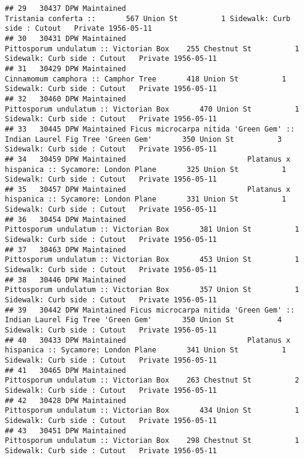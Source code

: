 \documentclass[
]{article}
\begin{document}
\begin{verbatim}
## 29   30437 DPW Maintained                                                     Tristania conferta ::       567 Union St          1 Sidewalk: Curb side : Cutout   Private 1956-05-11
## 30   30431 DPW Maintained                                    Pittosporum undulatum :: Victorian Box    255 Chestnut St          1 Sidewalk: Curb side : Cutout   Private 1956-05-11
## 31   30429 DPW Maintained                                       Cinnamomum camphora :: Camphor Tree       418 Union St          1 Sidewalk: Curb side : Cutout   Private 1956-05-11
## 32   30460 DPW Maintained                                    Pittosporum undulatum :: Victorian Box       470 Union St          1 Sidewalk: Curb side : Cutout   Private 1956-05-11
## 33   30445 DPW Maintained Ficus microcarpa nitida 'Green Gem' :: Indian Laurel Fig Tree 'Green Gem'       350 Union St          3 Sidewalk: Curb side : Cutout   Private 1956-05-11
## 34   30459 DPW Maintained                            Platanus x hispanica :: Sycamore: London Plane       325 Union St          1 Sidewalk: Curb side : Cutout   Private 1956-05-11
## 35   30457 DPW Maintained                            Platanus x hispanica :: Sycamore: London Plane       331 Union St          1 Sidewalk: Curb side : Cutout   Private 1956-05-11
## 36   30454 DPW Maintained                                    Pittosporum undulatum :: Victorian Box       381 Union St          1 Sidewalk: Curb side : Cutout   Private 1956-05-11
## 37   30463 DPW Maintained                                    Pittosporum undulatum :: Victorian Box       453 Union St          1 Sidewalk: Curb side : Cutout   Private 1956-05-11
## 38   30446 DPW Maintained                                    Pittosporum undulatum :: Victorian Box       357 Union St          1 Sidewalk: Curb side : Cutout   Private 1956-05-11
## 39   30442 DPW Maintained Ficus microcarpa nitida 'Green Gem' :: Indian Laurel Fig Tree 'Green Gem'       350 Union St          4 Sidewalk: Curb side : Cutout   Private 1956-05-11
## 40   30433 DPW Maintained                            Platanus x hispanica :: Sycamore: London Plane       341 Union St          1 Sidewalk: Curb side : Cutout   Private 1956-05-11
## 41   30465 DPW Maintained                                    Pittosporum undulatum :: Victorian Box    263 Chestnut St          2 Sidewalk: Curb side : Cutout   Private 1956-05-11
## 42   30428 DPW Maintained                                    Pittosporum undulatum :: Victorian Box       434 Union St          1 Sidewalk: Curb side : Cutout   Private 1956-05-11
## 43   30451 DPW Maintained                                    Pittosporum undulatum :: Victorian Box    298 Chestnut St          1 Sidewalk: Curb side : Cutout   Private 1956-05-11

\end{verbatim}
\end{document}
